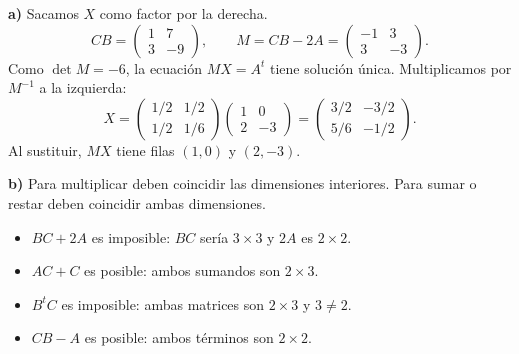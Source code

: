 \textbf{a)} Sacamos $X$ como factor por la derecha.
\[
CB=\begin{pmatrix}1&7\\3&-9\end{pmatrix},\qquad
M=CB-2A=\begin{pmatrix}-1&3\\3&-3\end{pmatrix}.
\]
Como $\det M=-6$, la ecuación $MX=A^t$ tiene solución única.
Multiplicamos por $M^{-1}$ a la izquierda:
\[
X=\begin{pmatrix}1/2&1/2\\1/2&1/6\end{pmatrix}
  \begin{pmatrix}1&0\\2&-3\end{pmatrix}
=\boxed{\begin{pmatrix}3/2&-3/2\\5/6&-1/2\end{pmatrix}}.
\]
Al sustituir, $MX$ tiene filas $(1,0)$ y $(2,-3)$.

\textbf{b)} Para multiplicar deben coincidir las dimensiones interiores.
Para sumar o restar deben coincidir ambas dimensiones.
\begin{itemize}
\item $BC+2A$ es imposible: $BC$ sería $3\times3$ y $2A$ es $2\times2$.
\item $AC+C$ es posible: ambos sumandos son $2\times3$.
\item $B^tC$ es imposible: ambas matrices son $2\times3$ y $3\ne2$.
\item $CB-A$ es posible: ambos términos son $2\times2$.
\end{itemize}
